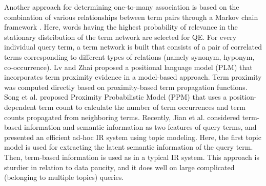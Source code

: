 Another approach for determining one-to-many association is based on the combination of various relationships between term pairs through a Markov chain framework \cite{collins2005query}. Here, words having the highest probability of relevance in the stationary distribution of the term network are selected for QE. For every individual query term, a term network is built that consists of a pair of correlated terms corresponding to different types of relations (namely synonym, hyponym, co-occurrence). Lv and Zhai \cite{lv2009positional} proposed a positional language model (PLM) that incorporates term proximity evidence in a model-based approach. Term proximity was computed directly based on proximity-based term propagation functions. Song et al. \cite{song2011proximity} proposed Proximity Probabilistic Model (PPM) that uses a position-dependent term count to calculate the number of term occurrences and term counts propagated from neighboring terms. Recently, Jian et al. \cite{jian2016simple} considered term-based information and semantic information as two features of query terms, and presented an efficient ad-hoc IR system using topic modeling. Here, the first topic model is used for extracting the latent semantic information of the query term. Then, term-based information is used as in a typical IR system. This approach is sturdier in relation to data paucity, and it does well on large complicated (belonging to multiple topics) queries. 

